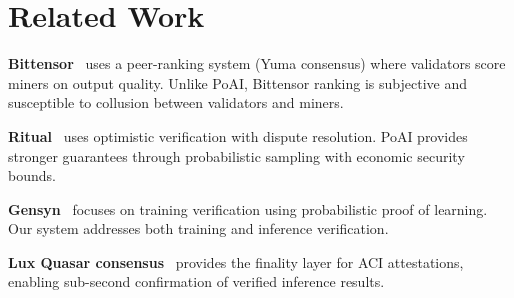 \section{Related Work}

\label{sec:related}

\textbf{Bittensor}~\cite{bittensor} uses a peer-ranking system (Yuma consensus)
where validators score miners on output quality. Unlike PoAI, Bittensor ranking
is subjective and susceptible to collusion between validators and miners.

\textbf{Ritual}~\cite{ritual} uses optimistic verification with dispute
resolution. PoAI provides stronger guarantees through probabilistic sampling
with economic security bounds.

\textbf{Gensyn}~\cite{gensyn} focuses on training verification using
probabilistic proof of learning. Our system addresses both training and
inference verification.

\textbf{Lux Quasar consensus}~\cite{luxwhitepaper} provides the finality layer
for ACI attestations, enabling sub-second confirmation of verified inference
results.

